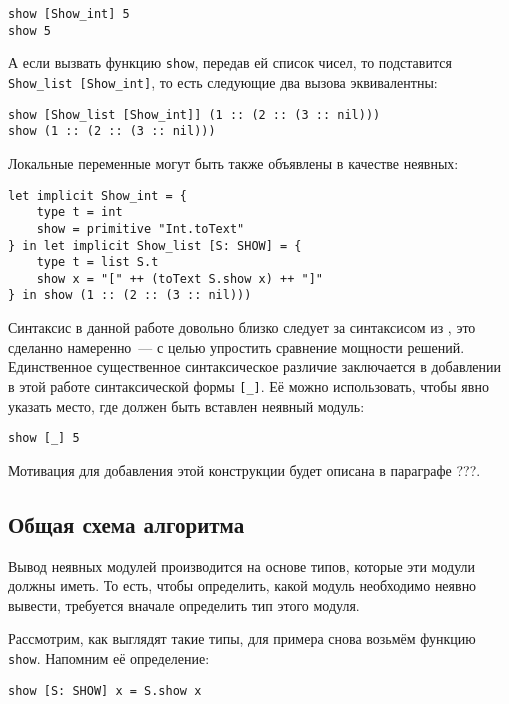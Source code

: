 \documentclass[../diploma.tex]{subfiles}
\begin{document}
\begin{verbatim}
show [Show_int] 5
show 5
\end{verbatim}

А если вызвать функцию \texttt{show}, передав ей список чисел, то подставится \\ \texttt{Show\_list [Show\_int]}, то есть следующие два вызова эквивалентны:

\begin{verbatim}
show [Show_list [Show_int]] (1 :: (2 :: (3 :: nil)))
show (1 :: (2 :: (3 :: nil)))
\end{verbatim}

Локальные переменные могут быть также объявлены в качестве неявных:

\begin{verbatim}
let implicit Show_int = {
    type t = int
    show = primitive "Int.toText"
} in let implicit Show_list [S: SHOW] = {
    type t = list S.t
    show x = "[" ++ (toText S.show x) ++ "]"
} in show (1 :: (2 :: (3 :: nil)))
\end{verbatim}

Синтаксис в данной работе довольно близко следует за синтаксисом из \cite{white}, это сделанно намеренно~--- с целью упростить сравнение мощности решений. Единственное существенное синтаксическое различие заключается в добавлении в этой работе синтаксической формы \texttt{[\_]}. Её можно использовать, чтобы явно указать место, где должен быть вставлен неявный модуль:

\begin{verbatim}
show [_] 5
\end{verbatim}

Мотивация для добавления этой конструкции будет описана в параграфе ???.

\subsection{Общая схема алгоритма}

Вывод неявных модулей производится на основе типов, которые эти модули должны иметь. То есть, чтобы определить, какой модуль необходимо неявно вывести, требуется вначале определить тип этого модуля. 

Рассмотрим, как выглядят такие типы, для примера снова возьмём функцию \texttt{show}. Напомним её определение:

\begin{verbatim}
show [S: SHOW] x = S.show x
\end{verbatim}
\end{document}
